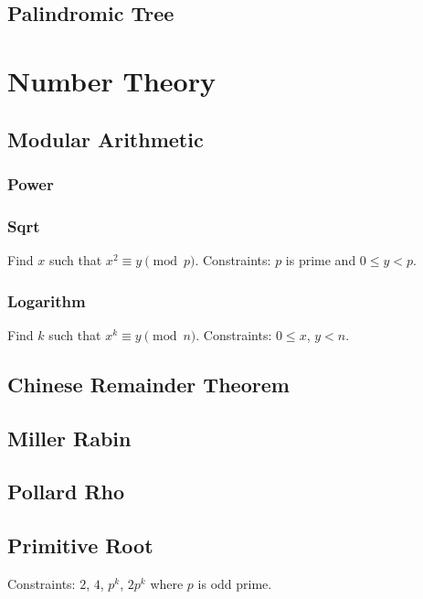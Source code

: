 \documentclass{article}
\begin{document}
\begin{multicols}{2}
    \subsection{Palindromic Tree}
    

    \section{Number Theory}
    \subsection{Modular Arithmetic}
    \subsubsection{Power}
    
    \subsubsection{Sqrt}
    Find $x$ such that $x^2\equiv y\pmod p$.
    \newline Constraints: $p$ is prime and $0\le y<p$.
    
    \subsubsection{Logarithm}
    Find $k$ such that $x^k\equiv y\pmod n$.
    \newline Constraints: $0\le x$, $y<n$.
    
    \subsection{Chinese Remainder Theorem}
    
    \subsection{Miller Rabin}
    
    \subsection{Pollard Rho}
    
    \subsection{Primitive Root}
    Constraints: $2$, $4$, $p^k$, $2p^{k}$ where $p$ is odd prime.
    

\end{multicols}
\end{document}
